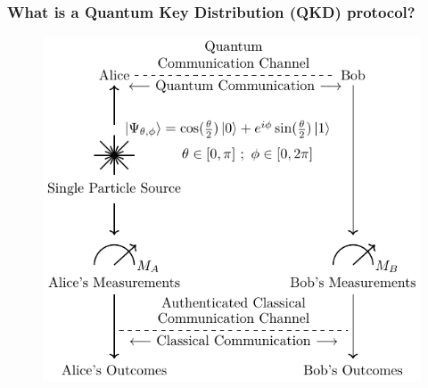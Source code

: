 \documentclass{beamer}
\begin{document}
		\begin{frame}
			\frametitle{\large What is a Quantum Key Distribution (QKD) protocol?}

            \vspace{4ex}
            \begin{figure}
                \centering
                \begin{minipage}{0.5\textwidth}
                    \centering
                    \includegraphics[width=0.95\linewidth, height=0.5\textheight]{figures/pdf/prepare-and-measure-qkd-protocol.pdf}
                    \vspace{-1.5ex}
                    \caption{\color{blue}{Figure 1a: }}
                    \label{fig:prepare-measure-qkd-protocol}
                \end{minipage}%
                \begin{minipage}{0.5\textwidth}
                    \centering

\end{minipage}
\end{figure}
\end{frame}
\end{document}
